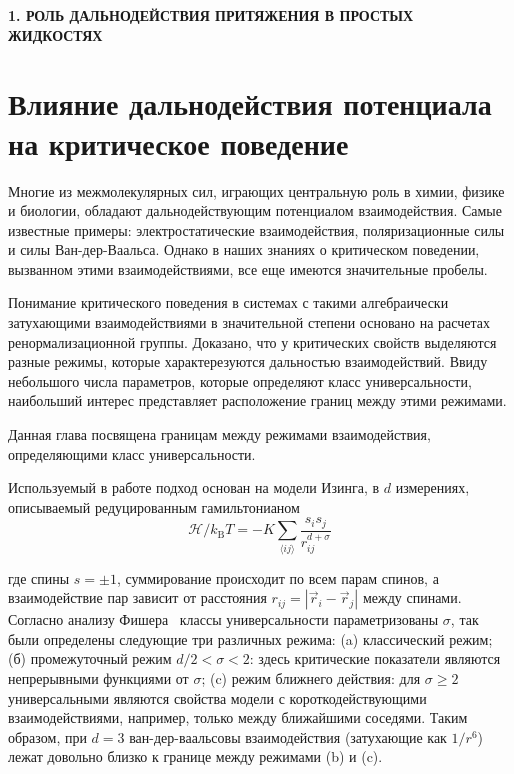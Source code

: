 
\begin{center}
\textbf{\large 1. РОЛЬ ДАЛЬНОДЕЙСТВИЯ ПРИТЯЖЕНИЯ В ПРОСТЫХ ЖИДКОСТЯХ}
\end{center}


\section{Влияние дальнодействия потенциала на критическое поведение}

Многие из межмолекулярных сил, играющих центральную роль в химии, физике и биологии, обладают дальнодействующим потенциалом взаимодействия.
Самые известные примеры: электростатические взаимодействия, поляризационные силы и силы Ван-дер-Ваальса.
Однако в наших знаниях о критическом поведении, вызванном этими взаимодействиями, все еще имеются значительные пробелы.

Понимание критического поведения в системах с такими алгебраически затухающими взаимодействиями в значительной степени основано на расчетах ренормализационной группы.
Доказано, что у критических свойств выделяются разные режимы, которые характерезуются дальностью взаимодействий.
Ввиду небольшого числа параметров, которые определяют класс универсальности, наибольший интерес представляет расположение границ между этими режимами.

Данная глава посвящена границам между режимами взаимодействия, определяющими класс универсальности. 

Используемый в работе подход основан на модели Изинга, в $d$ измерениях, описываемый редуцированным гамильтонианом
\begin{equation}
\mathcal{H} / k_{\mathrm{B}} T=-K \sum_{\langle i j\rangle} \frac{s_{i} s_{j}}{r_{i j}^{d+\sigma}}
\label{eq1}
\end{equation}

где спины $s=\pm 1$, суммирование происходит по всем парам спинов, а взаимодействие пар зависит от расстояния $r_{i j}=\left|\vec {r}_{i}-\vec{r}_{j}\right|$ между спинами. 
Согласно анализу Фишера~\cite{10.1103/PhysRevLett.29.917} классы универсальности параметризованы $\sigma$, так были определены следующие три различных режима: (a) классический режим; (б) промежуточный режим $d/2<\sigma<2$: здесь критические показатели являются непрерывными функциями от $\sigma$; (c) режим ближнего действия: для $\sigma\geq 2$ универсальными являются свойства модели с короткодействующими взаимодействиями, например, только между ближайшими соседями. 
Таким образом, при $d=3$ ван-дер-ваальсовы взаимодействия (затухающие как $1/r^{6}$) лежат довольно близко к границе между режимами (b) и (c).

